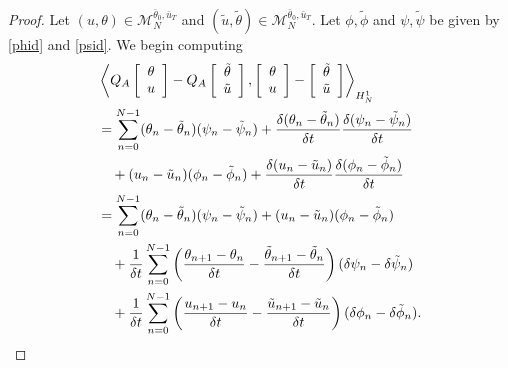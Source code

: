 \documentclass[12pt]{amsart}
\newcommand{\1}{{\chi}}
\newcommand{\Mm}{{\mathcal{M}}}
\newcommand{\lb}{\left(}
\newcommand{\rb}{\right)}
\theoremstyle{definition}
\begin{document}
        \begin{proof}
                Let $(u,\theta)\in \Mm_N^{\bar \theta_0,\bar u_T}$ and $(\tilde u, \tilde \theta)\in \Mm_N^{\bar \theta_0,\bar u_T}$. Let $\phi, \tilde \phi$ and $\psi, \tilde\psi$ be given by \eqref{phid} and \eqref{psid}. 
                We begin computing
                \begin{align}
        \label{eq:H1norm_disc}\notag
                        &\left\langle Q_A\left[\begin{array}{c}
                        \theta\\
                        u
                        \end{array}\right]- Q_A\left[\begin{array}{c}
                        \tilde\theta\\
                        \tilde u
                        \end{array}\right],\left[\begin{array}{c}
                        \theta\\
                        u
                        \end{array}\right]-\left[\begin{array}{c}
                        \tilde\theta\\
                        \tilde u
                        \end{array}\right]\right\rangle_{H^1_N}
                        \\
            &=\sum_{n=0}^{N-1} (\theta_n-\tilde \theta_n)(\psi_n - \tilde\psi_n) 
                +\frac{\delta (\theta_n - {\tilde{\theta}}_n)}{\delta t} \frac{\delta (\psi_n - \tilde{\psi}_n)}{\delta t} \nonumber\\
            &\quad+ (u_n-\tilde u_n)(\phi_n-\tilde \phi_n) + \frac{\delta (u_n -{\tilde u}_n)}{\delta t}\frac{\delta({\phi}_n-{\tilde \phi}_n)}{\delta t} \nonumber\\
            &=\sum_{n=0}^{N-1} (\theta_n-\tilde \theta_n)(\psi_n - \tilde\psi_n) + (u_n-\tilde u_n)(\phi_n-\tilde \phi_n) \nonumber\\
            &\quad+\frac{1}{\delta t}\sum_{n=0}^{N-1}\lb\frac{\theta_{n+1}-\theta_n}{\delta t} 
                - \frac{\tilde\theta_{n+1}-\tilde\theta_n}{\delta t}\rb  (\delta{\psi}_n-\delta{\tilde \psi}_n)\nonumber\\
            &\quad+\frac{1}{\delta t}\sum_{n=0}^{N-1}\lb \frac{u_{n+1}-u_n}{\delta t} 
                - \frac{\tilde u_{n+1}-\tilde u_n}{\delta t} \rb (\delta{\phi}_n - \delta{\tilde \phi}_n).

\end{align}
\end{proof}
\end{document}
